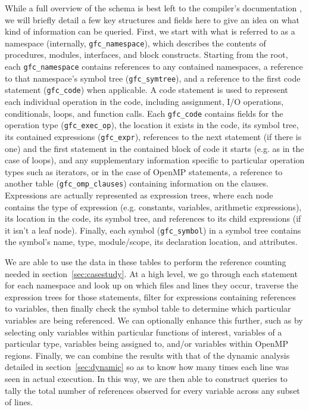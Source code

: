 While a full overview of the schema is best left to the compiler's documentation \cite{gcc-docs}, we will briefly detail a few key structures and fields here to give an idea on what kind of information can be queried.
First, we start with what is referred to as a namespace (internally, \texttt{gfc\_namespace}), which describes the contents of procedures, modules, interfaces, and block constructs.
Starting from the root, each \texttt{gfc\_namespace} contains references to any contained namespaces, a reference to that namespace's symbol tree (\texttt{gfc\_symtree}), and a reference to the first code statement (\texttt{gfc\_code}) when applicable.
A code statement is used to represent each individual operation in the code, including assignment, \acs{I/O} operations, conditionals, loops, and function calls.
Each \texttt{gfc\_code} contains fields for the operation type (\texttt{gfc\_exec\_op}), the location it exists in the code, its symbol tree, its contained expressions (\texttt{gfc\_expr}), references to the next statement (if there is one) and the first statement in the contained block of code it starts (e.g. as in the case of loops), and any supplementary information specific to particular operation types such as iterators, or in the case of OpenMP statements, a reference to another table (\texttt{gfc\_omp\_clauses}) containing information on the clauses.
Expressions are actually represented as expression trees, where each node contains the type of expression (e.g. constants, variables, arithmetic expressions), its location in the code, its symbol tree, and references to its child expressions (if it isn't a leaf node).
Finally, each symbol (\texttt{gfc\_symbol}) in a symbol tree contains the symbol's name, type, module/scope, its declaration location, and attributes.

We are able to use the data in these tables to perform the reference counting needed in section~\ref{sec:casestudy}.
At a high level, we go through each statement for each namespace and look up on which files and lines they occur, traverse the expression trees for those statements, filter for expressions containing references to variables, then finally check the symbol table to determine which particular variables are being referenced.
We can optionally enhance this further, such as by selecting only variables within particular functions of interest, variables of a particular type, variables being assigned to, and/or variables within OpenMP regions.
Finally, we can combine the results with that of the dynamic analysis detailed in section~\ref{sec:dynamic} so as to know how many times each line was seen in actual execution.
In this way, we are then able to construct queries to tally the total number of references observed for every variable across any subset of lines.

